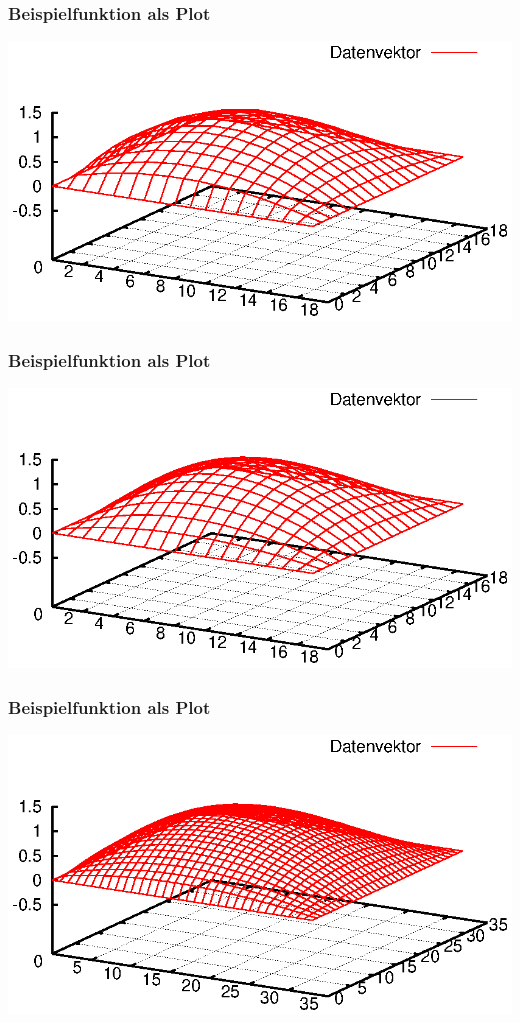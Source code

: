\documentclass{beamer}
\begin{document}
\begin{frame}\frametitle{Beispielfunktion als Plot}\includegraphics[width=\textwidth]{plots/006}\end{frame}
\begin{frame}\frametitle{Beispielfunktion als Plot}\includegraphics[width=\textwidth]{plots/007}\end{frame}
\begin{frame}\frametitle{Beispielfunktion als Plot}\includegraphics[width=\textwidth]{plots/008}\end{frame}
\end{document}
